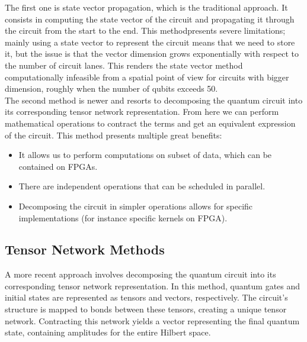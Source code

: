 \documentclass[12pt,oneside,a4paper]{article}
\begin{document}
The first one is state vector propagation, which is the traditional approach. It consists in computing the state vector of the circuit and propagating it through the circuit from the start to the end. This methodpresents severe limitations; mainly using a state vector to represent the circuit means that we need to store it, but the issue is that the vector dimension grows exponentially with respect to the number of circuit lanes. This renders the state vector method computationally infeasible from a spatial point of view for circuits with bigger dimension, roughly when the number of qubits exceeds 50.\\

The second method is newer and resorts to decomposing the quantum circuit into its corresponding tensor network representation. From here we can perform mathematical operations to contract the terms and get an equivalent expression of the circuit.
This method presents multiple great benefits:
\begin{itemize}
    \item It allows us to perform computations on subset of data, which can be contained on FPGAs.
    \item There are independent operations that can be scheduled in parallel.
    \item Decomposing the circuit in simpler operations allows for specific implementations (for instance specific kernels on FPGA).
\end{itemize}

\subsection{Tensor Network Methods}
A more recent approach involves decomposing the quantum circuit into its corresponding tensor network representation. In this method, quantum gates and initial states are represented as tensors and vectors, respectively. The circuit's structure is mapped to bonds between these tensors, creating a unique tensor network. Contracting this network yields a vector representing the final quantum state, containing amplitudes for the entire Hilbert space.\\
\end{document}
